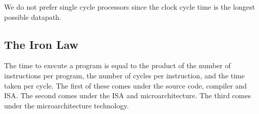 \documentclass{article}
\begin{document}
		We do not prefer single cycle processors since the clock cycle time is the longest possible datapath.

		\subsection{The Iron Law}

			The time to execute a program is equal to the product of the number of instructions per program, the number of cycles per instruction, and the time taken per cycle. The first of these comes under the source code, compiler and ISA. The second comes under the ISA and microarchitecture. The third comes under the microarchitecture technology.
\end{document}

